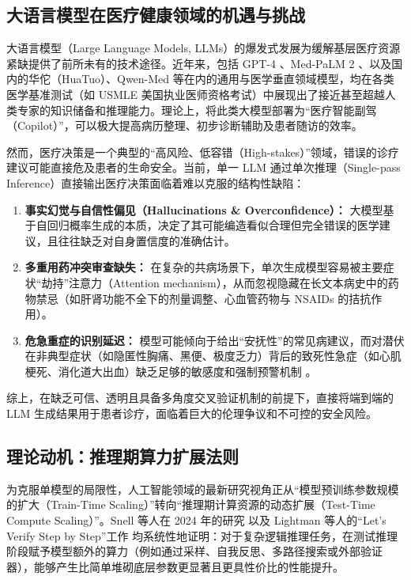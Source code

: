 \documentclass[11pt,a4paper]{ctexart}
\begin{document}
\subsection{大语言模型在医疗健康领域的机遇与挑战}

大语言模型（Large Language Models, LLMs）的爆发式发展为缓解基层医疗资源紧缺提供了前所未有的技术途径。近年来，包括 GPT-4 \cite{nori2023capabilities}、Med-PaLM 2 \cite{singhal2023medpalm}、以及国内的华佗（HuaTuo）、Qwen-Med 等在内的通用与医学垂直领域模型，均在各类医学基准测试（如 USMLE 美国执业医师资格考试）中展现出了接近甚至超越人类专家的知识储备和推理能力。理论上，将此类大模型部署为“医疗智能副驾（Copilot）”，可以极大提高病历整理、初步诊断辅助及患者随访的效率。

然而，医疗决策是一个典型的“高风险、低容错（High-stakes）”领域，错误的诊疗建议可能直接危及患者的生命安全。当前，单一 LLM 通过单次推理（Single-pass Inference）直接输出医疗决策面临着难以克服的结构性缺陷：
\begin{enumerate}
    \item \textbf{事实幻觉与自信性偏见（Hallucinations \& Overconfidence）：} 大模型基于自回归概率生成的本质，决定了其可能编造看似合理但完全错误的医学建议，且往往缺乏对自身置信度的准确估计。
    \item \textbf{多重用药冲突审查缺失：} 在复杂的共病场景下，单次生成模型容易被主要症状“劫持”注意力（Attention mechanism），从而忽视隐藏在长文本病史中的药物禁忌（如肝肾功能不全下的剂量调整、心血管药物与 NSAIDs 的拮抗作用）。
    \item \textbf{危急重症的识别延迟：} 模型可能倾向于给出“安抚性”的常见病建议，而对潜伏在非典型症状（如隐匿性胸痛、黑便、极度乏力）背后的致死性急症（如心肌梗死、消化道大出血）缺乏足够的敏感度和强制预警机制 \cite{lee2023benefits}。
\end{enumerate}

综上，在缺乏可信、透明且具备多角度交叉验证机制的前提下，直接将端到端的 LLM 生成结果用于患者诊疗，面临着巨大的伦理争议和不可控的安全风险。

\subsection{理论动机：推理期算力扩展法则}

为克服单模型的局限性，人工智能领域的最新研究视角正从“模型预训练参数规模的扩大（Train-Time Scaling）”转向“推理期计算资源的动态扩展（Test-Time Compute Scaling）”。Snell 等人在 2024 年的研究 \cite{snell2024scaling} 以及 Lightman 等人的“Let's Verify Step by Step”工作 \cite{lightman2024let} 均系统性地证明：对于复杂逻辑推理任务，在测试推理阶段赋予模型额外的算力（例如通过采样、自我反思、多路径搜索或外部验证器），能够产生比简单堆砌底层参数更显著且更具性价比的性能提升。
\end{document}
